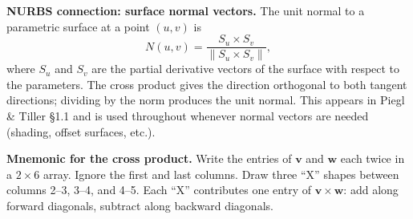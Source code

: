 \begin{remark*}[Exposition]
\textbf{NURBS connection: surface normal vectors.}
The unit normal to a parametric surface at a point $(u,v)$ is
\[
  N(u,v) = \frac{S_u \times S_v}{\|S_u \times S_v\|},
\]
where $S_u$ and $S_v$ are the partial derivative vectors of the surface
with respect to the parameters.
The cross product gives the direction orthogonal to both tangent directions;
dividing by the norm produces the unit normal.
This appears in Piegl \& Tiller \S{}1.1 and is used throughout whenever
normal vectors are needed (shading, offset surfaces, etc.).
\end{remark*}

\begin{remark*}[Exposition]
\textbf{Mnemonic for the cross product.}
Write the entries of $\mathbf{v}$ and $\mathbf{w}$ each twice in a $2 \times 6$ array.
Ignore the first and last columns.
Draw three ``X'' shapes between columns 2--3, 3--4, and 4--5.
Each ``X'' contributes one entry of $\mathbf{v} \times \mathbf{w}$: add along forward
diagonals, subtract along backward diagonals.
\end{remark*}

